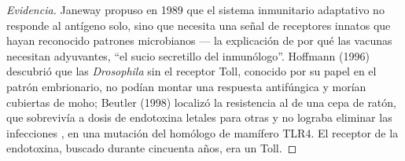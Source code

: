 \begin{proof}[Evidencia]
Janeway propuso en 1989 que el sistema inmunitario adaptativo no responde
al antígeno solo, sino que necesita una señal de receptores innatos que
hayan reconocido patrones microbianos --- la explicación de por qué las
vacunas necesitan adyuvantes, ``el sucio secretillo del inmunólogo''.
Hoffmann (1996) descubrió que las \emph{Drosophila} sin el receptor Toll,
conocido por su papel en el patrón embrionario, no podían montar una
respuesta antifúngica y morían cubiertas de moho; Beutler (1998) localizó
la resistencia al  de una cepa de ratón, que sobrevivía a
dosis de endotoxina letales para otras y no lograba eliminar las
infecciones , en una mutación del homólogo de mamífero TLR4.
El receptor de la endotoxina, buscado durante cincuenta años, era un
Toll.
\end{proof}

